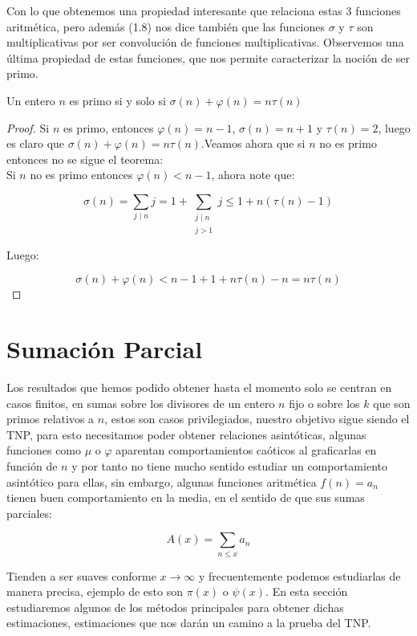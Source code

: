 Con lo que obtenemos una propiedad  interesante que relaciona estas 3 funciones aritmética, pero  además (1.8) nos dice también que las funciones $\sigma$ y $\tau$ son multiplicativas por ser convolución de funciones multiplicativas. Observemos una última propiedad de estas funciones, que nos permite caracterizar la noción de ser primo.

\begin{prop}
Un entero $n$ es primo si y solo si $\sigma(n)+\varphi(n)=n\tau(n)$
\end{prop}

\begin{proof}

Si $n$ es primo, entonces $\varphi(n)=n-1$, $\sigma(n)=n+1$ y $\tau(n)=2$, luego es claro que $\sigma(n)+\varphi(n)=n\tau(n)$.Veamos ahora que si $n$ no es primo entonces no se sigue el teorema:\\

Si $n$ no es primo entonces $\varphi(n)<n-1$, ahora note que:

$$\sigma(n)=\sum_{j\mid n}j=1+\sum_{\substack{j\mid n\\ j>1}}j\leq 1+n(\tau(n)-1) $$

Luego:

$$\sigma(n)+\varphi(n)<n-1+1+n\tau(n)-n=n\tau(n)$$
\end{proof}

\section{Sumación Parcial}

Los resultados que hemos podido obtener hasta el momento solo se centran en casos finitos, en sumas sobre los divisores de un entero $n$ fijo o sobre los $k$ que son primos relativos a $n$, estos son casos privilegiados, nuestro objetivo sigue siendo el TNP, para esto necesitamos poder obtener relaciones asintóticas, algunas funciones como $\mu$ o $\varphi$ aparentan comportamientos caóticos al graficarlas en función de $n$ y por tanto no tiene mucho sentido estudiar un comportamiento asintótico para  ellas, sin embargo, algunas funciones aritmética $f(n)=a_n$ tienen buen comportamiento en la media, en el sentido de que sus sumas parciales:

$$A(x)=\sum_{n\leq x}a_n$$

Tienden a ser suaves  conforme $x\to \infty$ y frecuentemente podemos estudiarlas de manera precisa, ejemplo de esto son $\pi(x)$ o $\psi(x)$. En esta sección estudiaremos algunos de los métodos principales para obtener dichas estimaciones, estimaciones que nos darán un camino a la prueba del TNP.\\

